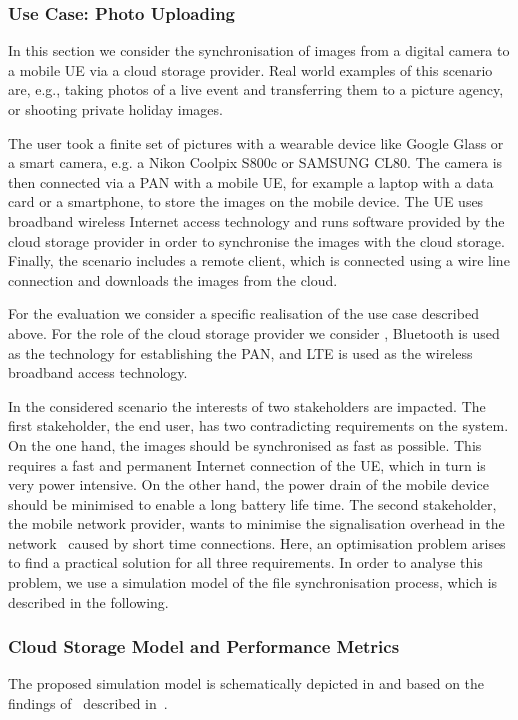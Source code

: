 \subsubsection*{Use Case: Photo Uploading}\label{sec:application:cloud_file_synchronisation:use_case}
In this section we consider the synchronisation of images from a digital camera to a mobile \gls{UE} via a cloud storage provider.
Real world examples of this scenario are, e.g., taking photos of a live event and transferring them to a picture agency, or shooting private holiday images. 

The user took a finite set of pictures with a wearable device like Google Glass or a smart camera, e.g. a Nikon Coolpix S800c or SAMSUNG CL80.
The camera is then connected via a \gls{PAN} with a mobile \gls{UE}, for example a laptop with a data card or a smartphone, to store the images on the mobile device.
The \gls{UE} uses broadband wireless Internet access technology and runs software provided by the cloud storage provider in order to synchronise the images with the cloud storage.
Finally, the scenario includes a remote client, which is connected using a wire line connection and downloads the images from the cloud.

For the evaluation we consider a specific realisation of the use case described above.
For the role of the cloud storage provider we consider \dropbox, Bluetooth is used as the technology for establishing the \gls{PAN}, and \gls{LTE} is used as the wireless broadband access technology.

In the considered scenario the interests of two stakeholders are impacted.
The first stakeholder, the end user, has two contradicting requirements on the system.
On the one hand, the images should be synchronised as fast as possible. 
This requires a fast and permanent Internet connection of the \gls{UE}, which in turn is very power intensive.
On the other hand, the power drain of the mobile device should be minimised to enable a long battery life time.
The second stakeholder, the mobile network provider, wants to minimise the signalisation overhead in the network~\cite{NSN2011, Huawei2011} caused by short time connections.
Here, an optimisation problem arises to find a practical solution for all three requirements. 
In order to analyse this problem, we use a simulation model of the file synchronisation process, which is described in the following.

\subsubsection*{Cloud Storage Model and Performance Metrics}\label{sec:application:cloud_file_synchronisation:system_model:model_metrics}
The proposed simulation model is schematically depicted in  and based on the findings of~\cite{Drago2012} described in~.

